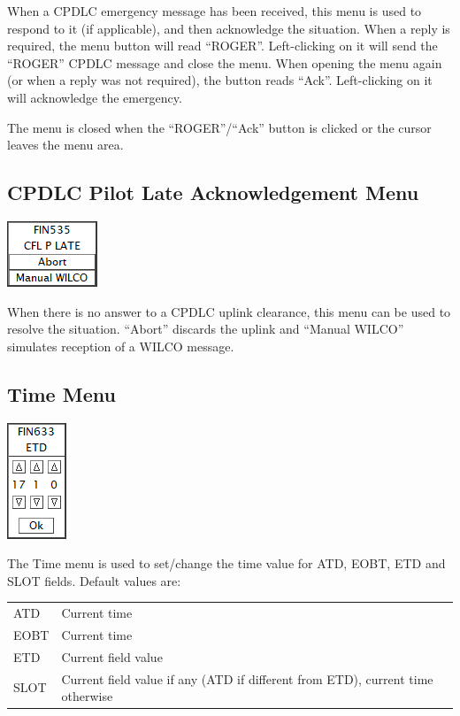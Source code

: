 \documentclass[11pt,a4paper]{memoir}
\begin{document}
When a CPDLC emergency message has been received, this menu is used to respond to it (if applicable), and then acknowledge the situation. When a reply is required, the menu button will read “ROGER”. Left-clicking on it will send the “ROGER” CPDLC message and close the menu. When opening the menu again (or when a reply was not required), the button reads “Ack”. Left-clicking on it will acknowledge the emergency. 

The menu is closed when the “ROGER”/“Ack” button is clicked or the cursor leaves the menu area.

\subsection{CPDLC Pilot Late Acknowledgement Menu}
\label{dlplam}
\includegraphics{img/dlplate.png}

When there is no answer to a CPDLC uplink clearance, this menu can be used to resolve the situation. “Abort” discards the uplink and “Manual WILCO” simulates reception of a WILCO message.

\subsection{Time Menu}
\label{time}
\includegraphics{img/etd.png}

The Time menu is used to set/change the time value for ATD, EOBT, ETD and SLOT fields.
Default values are:

\begin{tabular}{l l}
ATD     & Current time\\
EOBT    & Current time\\
ETD     & Current field value\\
SLOT    & Current field value if any (ATD if different from ETD), current time otherwise\\
\end{tabular}
\end{document}
